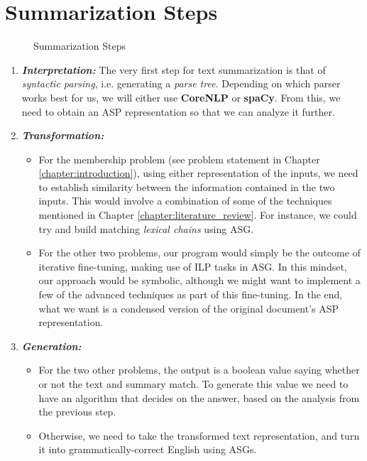 \section{Summarization Steps}

\begin{figure}[H]
\centering
{}
\caption{\cite{lloret_text_2008} Summarization Steps}
\label{fig:summarization_steps}
\end{figure}

\begin{enumerate}
\item \textit{\textbf{Interpretation:}} The very first step for text summarization is that of \textit{syntactic parsing}, i.e. generating a \textit{parse tree}. Depending on which parser works best for us, we will either use \textbf{CoreNLP} or \textbf{spaCy}. From this, we need to obtain an ASP representation so that we can analyze it further.
\item \textit{\textbf{Transformation:}}
  \begin{itemize}
  \item For the membership problem (see problem statement in Chapter \ref{chapter:introduction}), using either representation of the inputs, we need to establish similarity between the information contained in the two inputs. This would involve a combination of some of the techniques mentioned in Chapter \ref{chapter:literature_review}. For instance, we could try and build matching \textit{lexical chains} using ASG.
  \item For the other two problems, our program would simply be the outcome of iterative fine-tuning, making use of ILP tasks in ASG. In this mindset, our approach would be symbolic, although we might want to implement a few of the advanced techniques as part of this fine-tuning. In the end, what we want is a condensed version of the original document's ASP representation.
  \end{itemize}
\item \textit{\textbf{Generation:}}
  \begin{itemize}
  \item For the two other problems, the output is a boolean value saying whether or not the text and summary match. To generate this value we need to have an algorithm that decides on the answer, based on the analysis from the previous step.
  \item Otherwise, we need to take the transformed text representation, and turn it into grammatically-correct English using ASGs.
  \end{itemize}
\end{enumerate}

